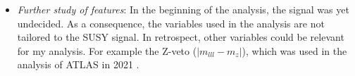 \begin{itemize}
          given the goal of extending the limits, it would most likely be beneficial to prioritize the regions closest to the existing limits, in hopes of achieving a higher sensitivity in these 
          regions\footnote{See the final paragraph in section \ref{sec:PCA}}.  
    \item \emph{Further study of features}: In the beginning of the analysis, the signal was yet undecided. As a consequence, the variables used in the analysis are not tailored to the \ac{SUSY} 
          signal. In retrospect, other variables could be relevant for my analysis. For example the Z-veto ($|m_{lll}-m_z|$), which was used in the analysis of \ac{ATLAS} in 2021 \cite{atlas_search_2021}. 
\end{itemize}